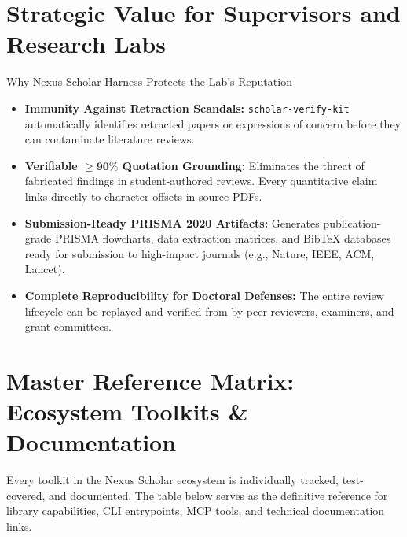\documentclass[10pt,a4paper]{article}
\newcommand{\codebadge}[1]{%
  \tcbox[on line, boxsep=0pt, left=3pt, right=3pt, top=1.5pt, bottom=1.5pt,
         colframe=Slate!40, colback=LightSlate, coltext=Navy, arc=2pt,
         boxrule=0.5pt, fontupper=\ttfamily\scriptsize]{#1}%
}
\begin{document}
\section{Strategic Value for Supervisors and Research Labs}

\begin{invariantbox}{Why Nexus Scholar Harness Protects the Lab's Reputation}
\begin{itemize}[leftmargin=1.2em, itemsep=1.5pt, topsep=1pt]
    \item \textbf{Immunity Against Retraction Scandals:} \texttt{scholar-verify-kit} automatically identifies retracted papers or expressions of concern before they can contaminate literature reviews.
    \item \textbf{Verifiable $\ge \mathbf{90\%}$ Quotation Grounding:} Eliminates the threat of fabricated findings in student-authored reviews. Every quantitative claim links directly to character offsets in source PDFs.
    \item \textbf{Submission-Ready PRISMA 2020 Artifacts:} Generates publication-grade PRISMA flowcharts, data extraction matrices, and BibTeX databases ready for submission to high-impact journals (e.g., Nature, IEEE, ACM, Lancet).
    \item \textbf{Complete Reproducibility for Doctoral Defenses:} The entire review lifecycle can be replayed and verified from \codebadge{audit/journal.jsonl} by peer reviewers, examiners, and grant committees.
\end{itemize}
\end{invariantbox}

\newpage
\section{Master Reference Matrix: Ecosystem Toolkits \& Documentation}

Every toolkit in the Nexus Scholar ecosystem is individually tracked, test-covered, and documented. The table below serves as the definitive reference for library capabilities, CLI entrypoints, MCP tools, and technical documentation links.
\end{document}

